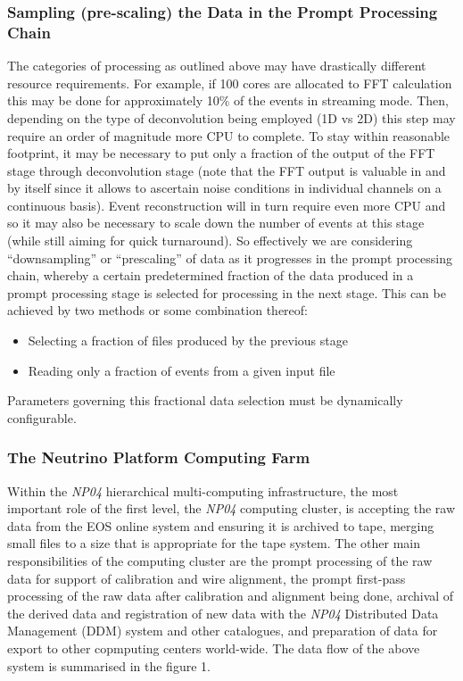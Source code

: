 \documentclass[pdftex,12pt,letter]{article}
\newcommand{\expname}{\textit{NP04}\xspace}
\begin{document}
\subsubsection{Sampling (pre-scaling) the Data in the Prompt Processing Chain}
\label{sec:downsampling}
The categories of processing as outlined above may have drastically different resource requirements.
For example, if 100 cores are allocated to FFT calculation this may be done for approximately 10\% of the events
in streaming mode. Then, depending on the type of deconvolution being employed (1D vs 2D) this step
may require an order of magnitude more CPU to complete. To stay within reasonable footprint,
it may be necessary to put only a fraction of the output of the FFT stage through deconvolution stage
(note that the FFT output is valuable in and by itself since it allows to ascertain noise conditions in individual channels
on a continuous basis). Event reconstruction will in turn require even more CPU
and so it may also be necessary to scale down the number of
events at this stage (while still aiming for quick turnaround). So effectively we are considering ``downsampling''
or ``prescaling'' 
of data as it progresses in the prompt processing chain, whereby a certain predetermined fraction of the data
produced in a prompt processing stage is selected for processing in the next stage.
This can be achieved by two methods or some combination thereof:
\begin{itemize}
\item Selecting a fraction of files produced by the previous stage
\item Reading only a fraction of events from a given input file
\end{itemize}

\noindent Parameters governing this fractional data selection must be dynamically configurable.

\subsubsection{The Neutrino Platform Computing Farm}
\label{sec:nptier0}

Within the \expname hierarchical multi-computing infrastructure, the most important role of the first level, the \expname computing cluster, is accepting the raw data from the EOS online system and ensuring it is archived to tape, merging small files to a size that is appropriate for the tape system. The other main responsibilities of the computing cluster are the prompt processing of the raw data for support of calibration and wire alignment, the prompt first-pass processing of the raw data after calibration and alignment being done, archival of the
derived data and registration of new data with the \expname Distributed Data Management (DDM) system and
other catalogues, and preparation of data for export to other copmputing centers world-wide. The data flow of the above system is summarised in the figure 1. 
\end{document}
